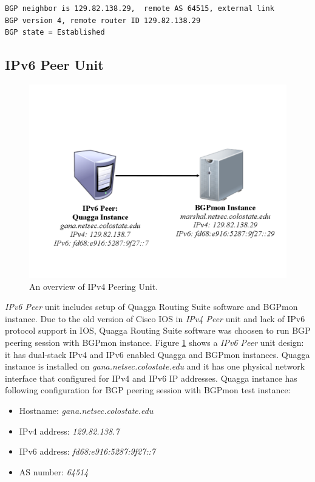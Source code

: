 \begin{verbatim}
BGP neighbor is 129.82.138.29,  remote AS 64515, external link
BGP version 4, remote router ID 129.82.138.29
BGP state = Established
\end{verbatim}




\subsection{IPv6 Peer Unit}

\begin{figure}
\centering
\includegraphics[scale=0.30]{figs/ipv6-peer.png}
\caption{An overview of IPv4 Peering Unit.}
\label{peerv6}
\end{figure}


\emph{IPv6 Peer} unit includes setup of Quagga Routing Suite software and BGPmon instance.     Due to the old version of Cisco IOS in \emph{IPv4 Peer} unit and lack of IPv6 protocol support in IOS,   Quagga  Routing Suite software was choosen to run BGP peering session with BGPmon instance.  Figure \ref{peerv6} shows a \emph{IPv6 Peer} unit design: it has dual-stack IPv4 and IPv6 enabled Quagga and BGPmon instances.   Quagga instance is installed on  \emph{gana.netsec.colostate.edu} and it has one physical network interface that configured for IPv4 and IPv6 IP addresses.   Quagga instance has following  configuration for BGP peering session with BGPmon test instance:
\begin{itemize}
  \item{Hostname: \emph{gana.netsec.colostate.edu}}
  \item{IPv4 address: \emph{129.82.138.7}}
  \item{IPv6 address: \emph{fd68:e916:5287:9f27::7}}
  \item{AS number: \emph{64514}}
\end{itemize}

